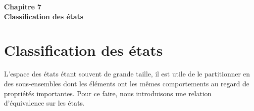 \vspace*{3cm}
\noindent \textbf{\Huge Chapitre 7} \\[1cm]  %
\textbf{\Huge Classification des états} \\[1.5cm]  %

\section{Classification des états}
\thispagestyle{plain} %
L’espace des états étant souvent de grande taille, il est utile de le partitionner en des sous-ensembles dont les éléments ont les mêmes comportements au regard de propriétés importantes. Pour ce faire, nous introduisons une relation d’équivalence sur les états.





